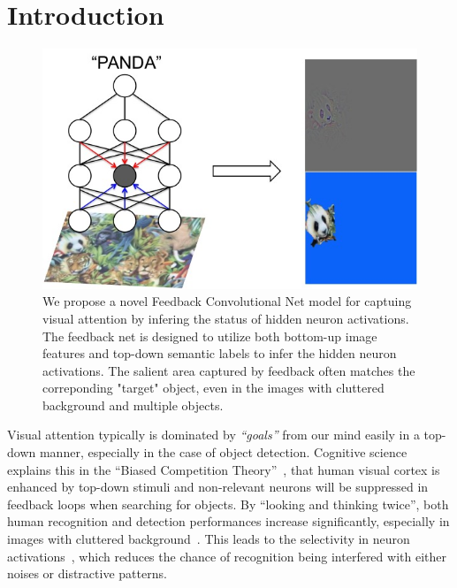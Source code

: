 \section{Introduction}

\begin{center}
\end{center}

\setlength{\tabcolsep}{2pt}
\begin{figure}[htb]
\begin{center}
\includegraphics[width=0.95\columnwidth]{figs/splash0/splash}
\caption{We propose a novel Feedback Convolutional Net model for captuing visual attention by infering the status of hidden neuron activations. The feedback net is designed to utilize both bottom-up image features and top-down semantic labels to infer the hidden neuron activations. The salient area captured by feedback often matches the correponding "target" object, even in the images with cluttered background and multiple objects.}
\label{fig:splash0}
\vspace{-10pt}
\end{center}
\end{figure}

Visual attention typically is dominated by \emph{``goals''} from our mind easily in a top-down manner, especially in the case of object detection. Cognitive science explains this in the ``Biased Competition Theory''~\cite{beck2009top,desimone1998visual,desimone1995neural}, that human visual cortex is enhanced by top-down stimuli and non-relevant neurons will be suppressed in feedback loops when searching for objects. By ``looking and thinking twice'', both human recognition and detection performances increase significantly, especially in images with cluttered background~\cite{Cichy2014Resolving}. This leads to the selectivity in neuron activations~\cite{Kruger2013Deep}, which reduces the chance of recognition being interfered with either noises or distractive patterns.

